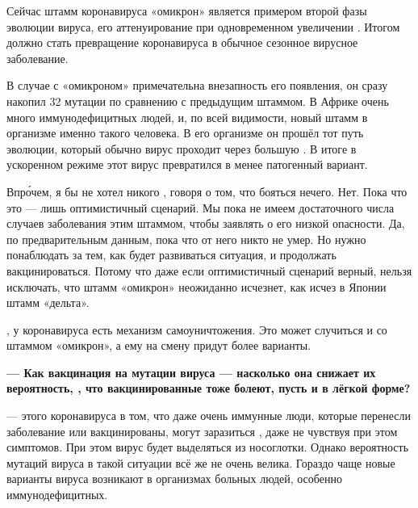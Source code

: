 \begin{fancyquotes}
    Сейчас штамм коронавируса «омикрон» является примером второй фазы эволюции вируса,  его аттенуирование при одновременном увеличении . Итогом должно стать превращение коронавируса в обычное сезонное вирусное заболевание.
\end{fancyquotes}

В случае с «омикроном» примечательна внезапность его появления, он сразу накопил 32 мутации по сравнению с предыдущим штаммом. В Африке очень много иммунодефицитных людей, и, по всей видимости, новый штамм  в организме именно такого человека. В его организме он прошёл тот путь эволюции, который обычно вирус проходит через большую  . В итоге в ускоренном режиме этот вирус превратился в менее патогенный вариант.

Впр\'{о}чем, я бы не хотел никого , говоря о том, что бояться нечего. Нет. Пока что это --- лишь оптимистичный сценарий. Мы пока не имеем достаточного числа случаев заболевания этим штаммом, чтобы заявлять о его низкой опасности. Да, по предварительным данным, пока что от него никто не умер. Но нужно понаблюдать за тем, как будет развиваться ситуация, и продолжать вакцинироваться. Потому что даже если оптимистичный сценарий верный, нельзя исключать, что штамм «омикрон» неожиданно исчезнет, как исчез в Японии штамм «дельта».

, у коронавируса есть механизм самоуничтожения. Это может случиться и со штаммом «омикрон», а ему на смену придут более  варианты.

{\bf --- Как вакцинация  на мутации вируса --- насколько она снижает их вероятность, , что вакцинированные тоже болеют, пусть и в лёгкой форме?}

---  этого коронавируса в том, что даже очень иммунные люди, которые перенесли заболевание или вакцинированы, могут заразиться , даже не чувствуя при этом симптомов. При этом вирус будет выделяться из носоглотки. Однако вероятность мутаций вируса в такой ситуации всё же не очень велика. Гораздо чаще новые варианты вируса возникают в организмах больных людей, особенно иммунодефицитных.

